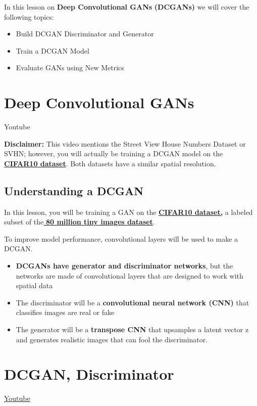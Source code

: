 In this lesson on \textbf{Deep Convolutional GANs} \textbf{(DCGANs)} we will cover the following topics:

\begin{itemize}
    \item Build DCGAN Discriminator and Generator
    \item Train a DCGAN Model
    \item Evaluate GANs using New Metrics
\end{itemize}

\section{Deep Convolutional GANs}
Youtube \newline

\textbf{Disclaimer:} This video mentions the Street View House Numbers Dataset or SVHN; however, you will actually be training a DCGAN model on the \href{https://www.cs.toronto.edu/~kriz/cifar.html}{\textbf{CIFAR10 dataset}}. Both datasets have a similar spatial resolution.

\subsection{Understanding a DCGAN}
In this lesson, you will be training a GAN on the \href{https://www.cs.toronto.edu/~kriz/cifar.html}{\textbf{CIFAR10 dataset,}} a labeled subset of the\href{http://people.csail.mit.edu/torralba/tinyimages/}{\textbf{ 80 million tiny images dataset}}. \newline

To improve model performance, convolutional layers will be used to make a DCGAN.

\begin{itemize}
    \item \textbf{DCGANs have generator and discriminator networks}, but the networks are made of convolutional layers that are designed to work with spatial data
    \item The discriminator will be a \textbf{convolutional neural network (CNN)} that classifies images are real or fake
    \item The generator will be a \textbf{transpose CNN} that upsamples a latent vector z and generates realistic images that can fool the discriminator.
\end{itemize}

\section{DCGAN, Discriminator}
\href{https://www.youtube.com/watch?v=5qVHECEB6H0}{Youtube} \newline

